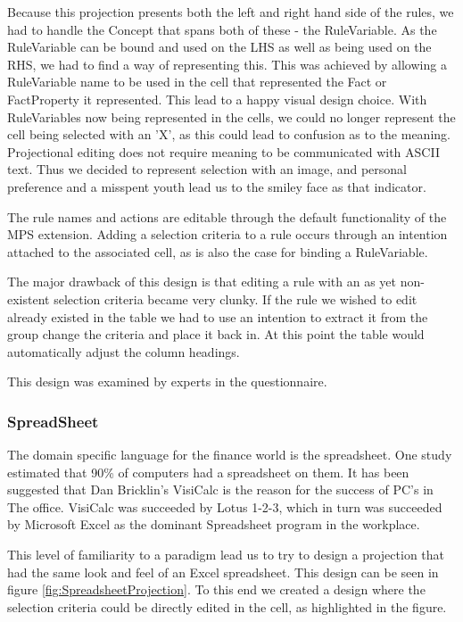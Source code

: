 Because this projection presents both the left and right hand side of the rules, we had to handle the Concept that spans both of these - the RuleVariable.
As the RuleVariable can be bound and used on the LHS as well as being used on the RHS, we had to find a way of representing this.
This was achieved by allowing a RuleVariable name to be used in the cell that represented the Fact or FactProperty it represented.
This lead to a happy visual design choice.
With RuleVariables now being represented in the cells, we could no longer represent the cell being selected with an 'X', as this could lead to confusion as to the meaning.
Projectional editing does not require meaning to be communicated with ASCII text.
Thus we decided to represent selection with an image, and personal preference and a misspent youth lead us to the smiley face as that indicator.

The rule names and actions are editable through the default functionality of the MPS extension.
Adding a selection criteria to a rule occurs through an intention attached to the associated cell, as is also the case for binding a RuleVariable.

The major drawback of this design is that editing a rule with an as yet non-existent selection criteria became very clunky.
If the rule we wished to edit already existed in the table we had to use an intention to extract it from the group change the criteria and place it back in.
At this point the table would automatically adjust the column headings.

This design was examined by experts in the questionnaire.

\subsubsection{SpreadSheet}

The domain specific language for the finance world is the spreadsheet.
One study estimated that 90\% of computers had a spreadsheet on them\cite{bradley2009using}.
It has been suggested that Dan Bricklin's VisiCalc is the reason for the success of PC's in The office.
VisiCalc was succeeded by Lotus 1-2-3, which in turn was succeeded by Microsoft Excel as the dominant Spreadsheet program in the workplace.

This level of familiarity to a paradigm lead us to try to design a projection that had the same look and feel of an Excel spreadsheet.
This design can be seen in figure \ref{fig:SpreadsheetProjection}.
To this end we created a design where the selection criteria could be directly edited in the cell, as highlighted in the figure.

